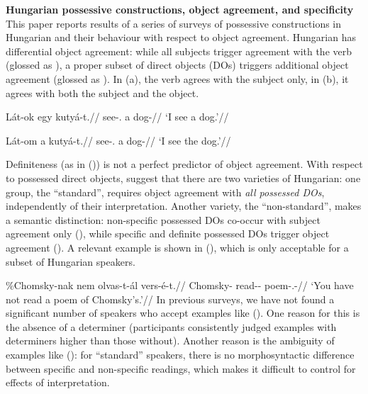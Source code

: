 



\noindent\textsf{\textbf{Hungarian possessive constructions, object agreement,
        and specificity}}\\[-.33\baselineskip]

\noindent This paper reports results of a series of surveys of possessive
constructions in Hungarian and their behaviour with respect to object
agreement.  Hungarian has differential object agreement: while all subjects
trigger agreement with the verb (glossed as \Sbj{}), a proper subset of direct
objects (DOs) triggers additional object agreement (glossed as \Obj{}). In
(\nextx a), the verb agrees with the subject only, in (\nextx b), it agrees
with both the subject and the object.

\noindent\begin{minipage}[t]{.5\textwidth}
\pex
    \a
    \begingl
        \gla    Lát-ok egy kutyá-t.//
        \glb    see-\Fsg.\Sbj{} a dog-\Acc{}//
        \glft   `I see a dog.'//
    \endgl
\xe
\end{minipage}
\begin{minipage}[t]{.5\textwidth}
\pex[exno=, exnoformat=X]
    \a[label=b]
    \begingl
        \gla    Lát-om a kutyá-t.//
        \glb    see-\Fsg.\Obj{} a dog-\Acc{}//
        \glft   `I see the dog.'//
    \endgl
\xe
\end{minipage}

\noindent Definiteness (as in (\lastx)) is not a perfect predictor of object
agreement. With respect to possessed direct objects,
\textcite{Szabolcsi1994,EKiss2000} suggest that there are two varieties of
Hungarian: one group, the \enquote{standard}, requires object agreement with
\emph{all possessed DOs}, independently of their interpretation. Another
variety, the \enquote{non-standard}, makes a semantic distinction: non-specific
possessed DOs co-occur with subject agreement only (\Sbj), while specific and
definite possessed DOs trigger object agreement (\Obj). A relevant example is
shown in (\nextx), which is only acceptable for a subset of Hungarian speakers.

\ex
    \begingl{}
        \gla    \ljudge\%Chomsky-nak nem olvas-t-ál vers-é-t.//
        \glb    Chomsky-\Dat{} \Neg{} read-\Pst-\Ssg{} poem-\Poss.\Tsg-\Acc{}//
        \glft   `You have not read a poem of Chomsky's.'//
    \endgl
\xe
In previous surveys, we have not found a significant number of speakers who
accept examples like (\lastx). One reason for this is the absence of a
determiner (participants consistently judged examples with determiners higher
than those without). Another reason is the ambiguity of examples like (\lastx):
for \enquote{standard} speakers, there is no morphosyntactic difference between
specific and non-specific readings, which makes it difficult to control for
effects of interpretation.

